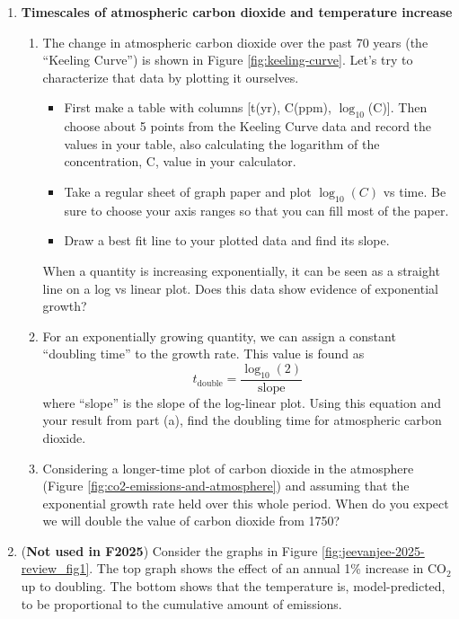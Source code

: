 \documentclass[12pt]{article}
\begin{document}
\begin{enumerate}
\begin{enumerate}
	\end{enumerate}

\item {\bf Timescales of atmospheric carbon dioxide and temperature increase}
	\begin{enumerate}
	\item The change in atmospheric carbon dioxide over the past 70 years (the ``Keeling Curve'') is shown in Figure \ref{fig:keeling-curve}.  Let's try to characterize that data by plotting it ourselves. 
		\begin{itemize}
		\item First make a table with columns [t(yr), C(ppm), $\log_{10}$(C)]. Then choose about 5 points from the Keeling Curve data and record the values in your table, also calculating the logarithm of the concentration, C, value in your calculator.
		\item Take a regular sheet of graph paper and plot $\log_{10}(C)$ vs time. Be sure to choose your axis ranges so that you can fill most of the paper.
		\item Draw a best fit line to your plotted data and find its slope.
		\end{itemize}
	When a quantity is increasing exponentially, it can be seen as a straight line on a log vs linear plot.  Does this data show evidence of exponential growth?  
	\item For an exponentially growing quantity, we can assign a constant ``doubling time''  to the growth rate.  This value is found as 
		\begin{equation*}
		t_\text{double} = \frac{ \log_{10} (2) }{ \text{slope} }
		\end{equation*}
	where ``slope'' is the slope of the log-linear plot.  Using this equation and your result from part (a), find the doubling time for atmospheric carbon dioxide.  
	\item Considering a longer-time plot of carbon dioxide in the atmosphere (Figure \ref{fig:co2-emissions-and-atmosphere}) and assuming that the exponential growth rate held over this whole period.  When do you expect we will double the value of carbon dioxide from 1750?
	\end{enumerate}
	
	
\newpage

\item ({\bf Not used in F2025}) Consider the graphs in Figure \ref{fig:jeevanjee-2025-review_fig1}. The top graph shows the effect of an annual 1\% increase in $\text{CO}_2$ up to doubling.  The bottom shows that the temperature is, model-predicted, to be proportional to the cumulative amount of emissions.
	

\end{enumerate}
\end{document}
